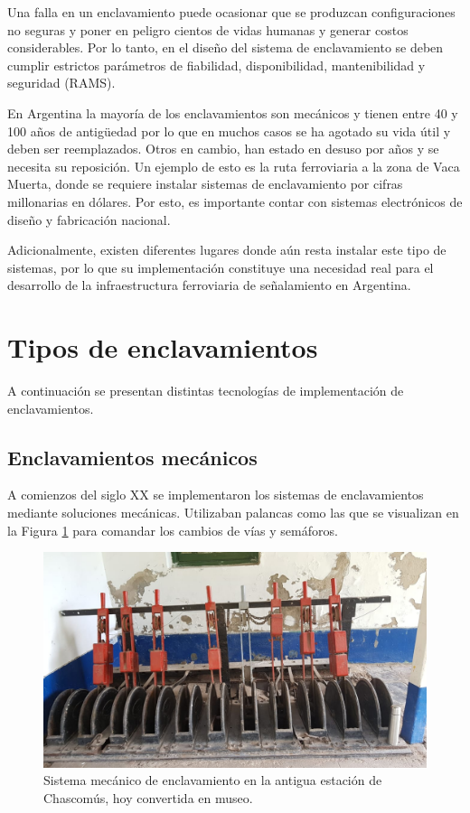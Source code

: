 	 	Una falla en un enclavamiento puede ocasionar que se produzcan configuraciones no seguras y poner en peligro cientos de vidas humanas y generar costos considerables. Por lo tanto, en el diseño del sistema de enclavamiento se deben cumplir estrictos parámetros de fiabilidad, disponibilidad, mantenibilidad y seguridad (RAMS).
	 	
		 En Argentina la mayoría de los enclavamientos son mecánicos y tienen entre 40 y 100 años de antigüedad por lo que en muchos casos se ha agotado su vida útil y deben ser reemplazados. Otros en cambio, han estado en desuso por años y se necesita su reposición. Un ejemplo de esto es la ruta ferroviaria a la zona de Vaca Muerta, donde se requiere instalar sistemas de enclavamiento por cifras millonarias en dólares. Por esto, es importante contar con sistemas electrónicos de diseño y fabricación nacional.

		Adicionalmente, existen diferentes lugares donde aún resta instalar este tipo de sistemas, por lo que su implementación constituye una necesidad real para el desarrollo de la infraestructura ferroviaria de señalamiento en Argentina.		
	
	\section{Tipos de enclavamientos}
		
		A continuación se presentan distintas tecnologías de implementación de enclavamientos.
		
		\subsection{Enclavamientos mecánicos}
			
			A comienzos del siglo XX se implementaron los sistemas de enclavamientos mediante soluciones mecánicas. Utilizaban palancas como las que se visualizan en la Figura \ref{fig:Mecanico} para comandar los cambios de vías y semáforos.
	
			\begin{figure}[htbp!]
				\centering
				\includegraphics[scale=.3]{./Figures/Mecanico}
				\caption{Sistema mecánico de enclavamiento en la antigua estación de Chascomús, hoy convertida en museo.}
				\label{fig:Mecanico}
			\end{figure}

